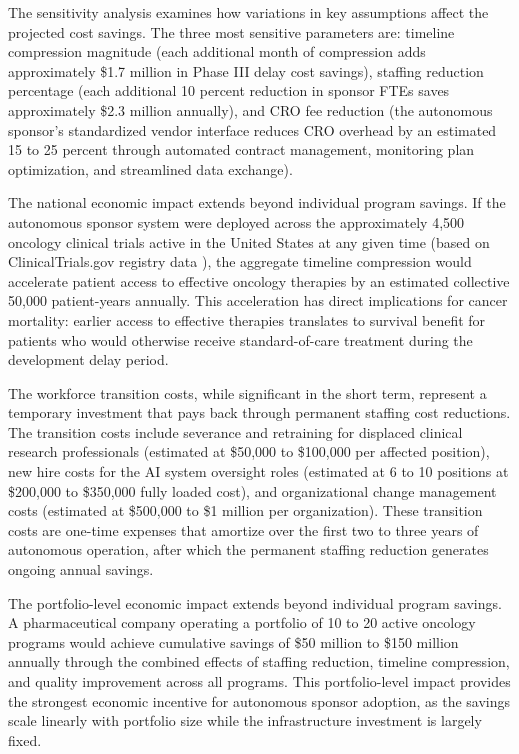 The sensitivity analysis examines how variations in key assumptions affect the projected
cost savings. The three most sensitive parameters are: timeline compression magnitude (each
additional month of compression adds approximately \$1.7 million in Phase III delay cost
savings), staffing reduction percentage (each additional 10 percent reduction in sponsor
FTEs saves approximately \$2.3 million annually), and CRO fee reduction (the autonomous
sponsor's standardized vendor interface reduces CRO overhead by an estimated 15 to 25
percent through automated contract management, monitoring plan optimization, and
streamlined data exchange).

The national economic impact extends beyond individual program savings. If the autonomous
sponsor system were deployed across the approximately 4,500 oncology clinical trials
active in the United States at any given time (based on ClinicalTrials.gov registry data
\cite{clinicaltrials-gov}), the aggregate timeline compression would accelerate patient
access to effective oncology therapies by an estimated collective 50,000 patient-years
annually. This acceleration has direct implications for cancer mortality: earlier access
to effective therapies translates to survival benefit for patients who would otherwise
receive standard-of-care treatment during the development delay period.

The workforce transition costs, while significant in the short term, represent a temporary
investment that pays back through permanent staffing cost reductions. The transition costs
include severance and retraining for displaced clinical research professionals (estimated at
\$50,000 to \$100,000 per affected position), new hire costs for the AI system oversight
roles (estimated at 6 to 10 positions at \$200,000 to \$350,000 fully loaded cost), and
organizational change management costs (estimated at \$500,000 to \$1 million per
organization). These transition costs are one-time expenses that amortize over the first two
to three years of autonomous operation, after which the permanent staffing reduction
generates ongoing annual savings.

The portfolio-level economic impact extends beyond individual program savings. A
pharmaceutical company operating a portfolio of 10 to 20 active oncology programs would
achieve cumulative savings of \$50 million to \$150 million annually through the combined
effects of staffing reduction, timeline compression, and quality improvement across all
programs. This portfolio-level impact provides the strongest economic incentive for
autonomous sponsor adoption, as the savings scale linearly with portfolio size while the
infrastructure investment is largely fixed.

